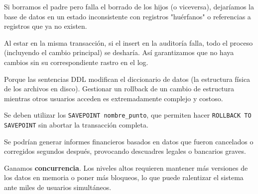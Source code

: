 \documentclass[12pt,a4paper]{article}
\begin{document}
\begin{tcolorbox}[title=Respuesta 8: Consistencia Relacional]
Si borramos el padre pero falla el borrado de los hijos (o viceversa), dejaríamos la base de datos en un estado inconsistente con registros "huérfanos" o referencias a registros que ya no existen.
\end{tcolorbox}

\begin{tcolorbox}[title=Respuesta 9: Integridad del Log]
Al estar en la misma transacción, si el insert en la auditoría falla, todo el proceso (incluyendo el cambio principal) se desharía. Así garantizamos que no haya cambios sin su correspondiente rastro en el log.
\end{tcolorbox}

\begin{tcolorbox}[title=Respuesta 10: Cambios Estructurales]
Porque las sentencias DDL modifican el diccionario de datos (la estructura física de los archivos en disco). Gestionar un rollback de un cambio de estructura mientras otros usuarios acceden es extremadamente complejo y costoso.
\end{tcolorbox}

\begin{tcolorbox}[title=Respuesta 11: Savepoints]
Se deben utilizar los \texttt{SAVEPOINT nombre\_punto}, que permiten hacer \texttt{ROLLBACK TO SAVEPOINT} sin abortar la transacción completa.
\end{tcolorbox}

\begin{tcolorbox}[title=Respuesta 12: Información Volátil]
Se podrían generar informes financieros basados en datos que fueron cancelados o corregidos segundos después, provocando descuadres legales o bancarios graves.
\end{tcolorbox}

\begin{tcolorbox}[title=Respuesta 13: Rendimiento vs Concurrencia]
Ganamos \textbf{concurrencia}. Los niveles altos requieren mantener más versiones de los datos en memoria o poner más bloqueos, lo que puede ralentizar el sistema ante miles de usuarios simultáneos.
\end{tcolorbox}
\end{document}
